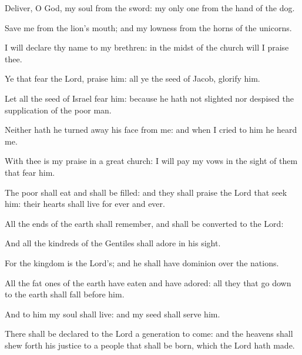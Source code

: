 \item Deliver, O God, my soul from the sword: my only one from the hand of the dog.
\item Save me from the lion’s mouth; and my lowness from the horns of the unicorns.
\item I will declare thy name to my brethren: in the midst of the church will I praise thee.
\item Ye that fear the Lord, praise him: all ye the seed of Jacob, glorify him.
\item Let all the seed of Israel fear him: because he hath not slighted nor despised the supplication of the poor man.
\item Neither hath he turned away his face from me: and when I cried to him he heard me.
\item With thee is my praise in a great church: I will pay my vows in the sight of them that fear him.
\item The poor shall eat and shall be filled: and they shall praise the Lord that seek him: their hearts shall live for ever and ever.
\item All the ends of the earth shall remember, and shall be converted to the Lord:
\item And all the kindreds of the Gentiles shall adore in his sight.
\item For the kingdom is the Lord’s; and he shall have dominion over the nations.
\item All the fat ones of the earth have eaten and have adored: all they that go down to the earth shall fall before him.
\item And to him my soul shall live: and my seed shall serve him.
\item There shall be declared to the Lord a generation to come: and the heavens shall shew forth his justice to a people that shall be born, which the Lord hath made.
